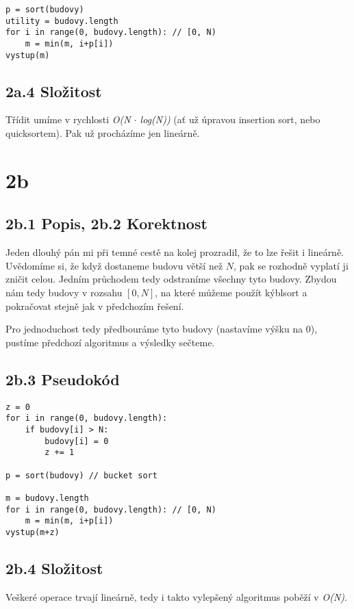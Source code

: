 \documentclass[a4paper]{article}
\begin{document}
\begin{lstlisting}
p = sort(budovy)
utility = budovy.length
for i in range(0, budovy.length): // [0, N)
    m = min(m, i+p[i])
vystup(m)
\end{lstlisting}

\subsection*{2a.4 Složitost}
Třídit umíme v rychlosti \textit{ O(N $\cdot$ log(N))} (ať už úpravou insertion sort, nebo quicksortem). Pak už procházíme jen lineárně.

\section*{2b}
\subsection*{2b.1 Popis, 2b.2 Korektnost}
Jeden dlouhý pán mi při temné cestě na kolej prozradil, že to lze řešit i lineárně. Uvědomíme si, že když dostaneme budovu větší než $N$, pak se rozhodně vyplatí ji zničit celou. Jedním průchodem tedy odstraníme všechny tyto budovy. Zbydou nám tedy budovy v rozsahu $[0,N]$, na které můžeme použít kýblsort a pokračovat stejně jak v předchozím řešení.

Pro jednoduchost tedy předbouráme tyto budovy (nastavíme výšku na 0), pustíme předchozí algoritmus a výsledky sečteme.

\subsection*{2b.3 Pseudokód}

\begin{lstlisting}
z = 0
for i in range(0, budovy.length):
    if budovy[i] > N:
        budovy[i] = 0
        z += 1

p = sort(budovy) // bucket sort

m = budovy.length
for i in range(0, budovy.length): // [0, N)
    m = min(m, i+p[i])
vystup(m+z)
\end{lstlisting}

\subsection*{2b.4 Složitost}
Veškeré operace trvají lineárně, tedy i takto vylepšený algoritmus poběží v \textit{ O(N)}. 
\end{document}

